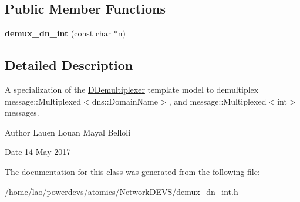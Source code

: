 \subsection*{Public Member Functions}
\begin{DoxyCompactItemize}
\item 
{\bfseries demux\+\_\+dn\+\_\+int} (const char $\ast$n)\hypertarget{classdemux__dn__int_a395091600cb7cae9e598a362f73d9bce}{}\label{classdemux__dn__int_a395091600cb7cae9e598a362f73d9bce}

\end{DoxyCompactItemize}


\subsection{Detailed Description}
A specialization of the \hyperlink{classDDemultiplexer}{D\+Demultiplexer} template model to demultiplex message\+::\+Multiplexed$<$dns\+::\+Domain\+Name$>$, and message\+::\+Multiplexed$<$int$>$ messages. 

\begin{DoxyAuthor}{Author}
Lauen Louan Mayal Belloli 
\end{DoxyAuthor}
\begin{DoxyDate}{Date}
14 May 2017 
\end{DoxyDate}


The documentation for this class was generated from the following file\+:\begin{DoxyCompactItemize}
\item 
/home/lao/powerdevs/atomics/\+Network\+D\+E\+V\+S/demux\+\_\+dn\+\_\+int.\+h\end{DoxyCompactItemize}
